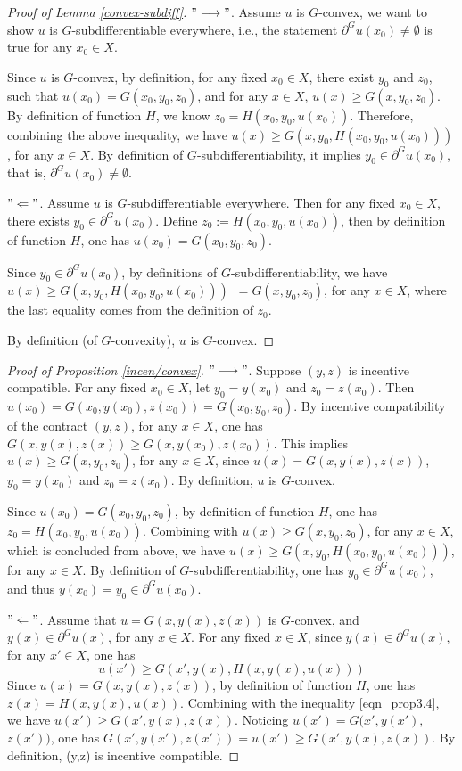 \documentclass[a4paper, 11pt]{amsart}
\numberwithin{equation}{section}
\theoremstyle{plain}
\theoremstyle{definition}
\theoremstyle{remark}
\begin{document}
\begin{proof}[Proof of Lemma \ref{convex-subdiff}]
$"\longrightarrow"$. Assume $u$ is $G$-convex, we want to show $u$ is $G$-subdifferentiable everywhere, i.e., the statement $\partial^G u(x_0)\neq \emptyset$ is true for any $ x_0\in X$.

Since $u$ is $G$-convex, by definition, for any fixed $x_0 \in X$, there exist $y_0$ and $z_0$, such that $u(x_0) = G(x_0,y_0,z_0)$, and for any $x \in X$, $u(x)\ge G(x, y_0, z_0)$. By definition of function $H$, we know $z_0 = H(x_0,y_0,u(x_0))$. Therefore, combining the above inequality, we have $u(x) \ge G(x, y_0, H(x_0,y_0,u(x_0)))$, for any $x \in X$. By definition of $G$-subdifferentiability, it implies $y_0 \in \partial^G u(x_0)$, that is, $\partial^G u(x_0) \neq \emptyset$.


$"\Leftarrow"$. Assume $u$ is $G$-subdifferentiable everywhere. Then for any fixed $x_0 \in X$, there exists $y_0 \in \partial^G u(x_0)$. Define $z_0:=H(x_0,y_0,u(x_0))$, then by definition of function $H$, one has $u(x_0) = G(x_0, y_0, z_0)$.

Since $y_0\in \partial^G u(x_0)$, by definitions of $G$-subdifferentiability, we have $u(x)\ge G(x,y_0,H(x_0,y_0,u(x_0)))$\ $ = G(x,y_0,z_0)$, for any $x\in X$, where the last equality comes from the definition of $z_0$.

By definition (of $G$-convexity), $u$ is $G$-convex.
\end{proof}
\vspace{0.3cm}
\begin{proof}[Proof of Proposition \ref{incen/convex}]
$"\longrightarrow"$. Suppose $(y,z)$ is incentive compatible. For any fixed $x_0 \in X$, let $y_0 = y(x_0)$ and $z_0 = z(x_0)$. Then $u(x_0) = G(x_0, y(x_0), z(x_0)) = G(x_0, y_0, z_0)$. By incentive compatibility of the contract $(y,z)$, for any $x\in X$, one has $G(x, y(x), z(x)) \ge G(x, y(x_0), z(x_0))$. This implies $u(x) \ge G(x,y_0,z_0)$, for any $x\in X$, since $u(x)= G(x, y(x), z(x))$,  $y_0 = y(x_0)$ and $z_0 = z(x_0)$. By definition, $u$ is $G$-convex. 

Since $u(x_0)=G(x_0, y_0, z_0)$, by definition of function $H$, one has $z_0 = H(x_0, y_0, u(x_0))$.  Combining with $u(x) \ge G(x, y_0, z_0)$,  for any $x\in X$, which is concluded from above, we have $u(x)\ge G(x, y_0, H(x_0, y_0, u(x_0)))$, for any $x\in X$. By definition of  $G$-subdifferentiability, one has $y_0 \in \partial^G u(x_0)$, and thus $y(x_0) = y_0 \in \partial^G u(x_0)$.

$"\Leftarrow"$. Assume that $u = G(x, y(x),z(x))$ is $G$-convex, and $y(x)\in \partial^G u(x)$, for any $x\in X$. For any fixed $x \in X$, since $y(x)\in \partial^G u(x)$, for any $x'\in X$, one has 
\begin{equation}\label{eqn_prop3.4}
	u(x')\ge G(x', y(x), H(x, y(x), u(x)))
\end{equation} 
Since $u(x) = G(x, y(x),z(x))$, by definition of function $H$, one has $z(x) = H(x,y(x), u(x))$. Combining with the inequality \eqref{eqn_prop3.4}, we have $u(x')\ge G(x', y(x), z(x))$. Noticing $u(x') = G(x',y(x'),$ $z(x')) $, one has $G(x',y(x'),z(x')) = u(x') \ge G(x', y(x), z(x))$.
By definition, (y,z) is incentive compatible.
\end{proof}
\end{document}
